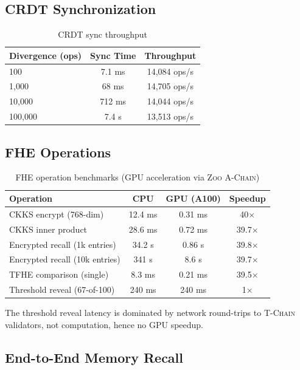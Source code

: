 \documentclass[11pt,letterpaper]{article}
\theoremstyle{definition}
\theoremstyle{remark}
\newcommand{\Zoo}{\textsc{Zoo}}
\newcommand{\AChain}{\textsc{A-Chain}}
\newcommand{\TChain}{\textsc{T-Chain}}
\begin{document}
\subsection{CRDT Synchronization}

\begin{table}[h]
\centering
\begin{tabular}{lcc}
\toprule
\textbf{Divergence (ops)} & \textbf{Sync Time} & \textbf{Throughput} \\
\midrule
100 & 7.1 ms & 14,084 ops/s \\
1,000 & 68 ms & 14,705 ops/s \\
10,000 & 712 ms & 14,044 ops/s \\
100,000 & 7.4 s & 13,513 ops/s \\
\bottomrule
\end{tabular}
\caption{CRDT sync throughput}
\label{tab:crdt_bench}
\end{table}

\subsection{FHE Operations}

\begin{table}[h]
\centering
\begin{tabular}{lccc}
\toprule
\textbf{Operation} & \textbf{CPU} & \textbf{GPU (A100)} & \textbf{Speedup} \\
\midrule
CKKS encrypt (768-dim) & 12.4 ms & 0.31 ms & 40$\times$ \\
CKKS inner product & 28.6 ms & 0.72 ms & 39.7$\times$ \\
Encrypted recall (1k entries) & 34.2 s & 0.86 s & 39.8$\times$ \\
Encrypted recall (10k entries) & 341 s & 8.6 s & 39.7$\times$ \\
TFHE comparison (single) & 8.3 ms & 0.21 ms & 39.5$\times$ \\
Threshold reveal (67-of-100) & 240 ms & 240 ms & 1$\times$ \\
\bottomrule
\end{tabular}
\caption{FHE operation benchmarks (GPU acceleration via \Zoo{} \AChain{})}
\label{tab:fhe_bench}
\end{table}

The threshold reveal latency is dominated by network round-trips to \TChain{} validators, not computation, hence no GPU speedup.

\subsection{End-to-End Memory Recall}
\end{document}

